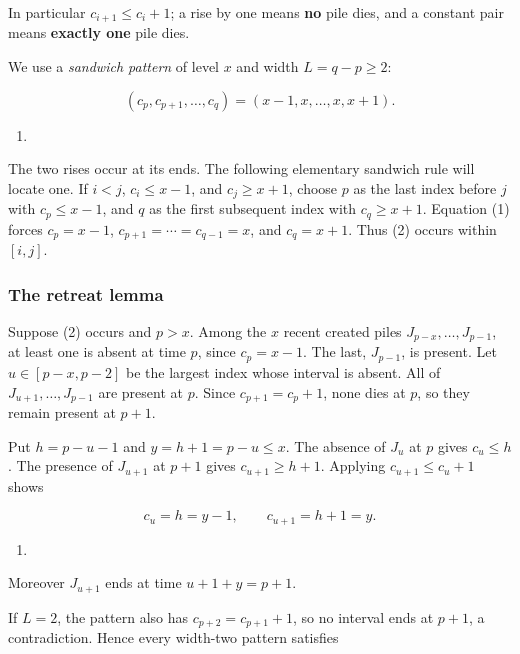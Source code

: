 \documentclass[11pt,a4paper]{article}
\providecommand{\tightlist}{\setlength{\itemsep}{0pt}\setlength{\parskip}{0pt}}
\begin{document}
In particular \(c_{i+1}\le c_i+1\); a rise by one means \textbf{no} pile dies, and a constant pair means \textbf{exactly one} pile dies.

We use a \emph{sandwich pattern} of level \(x\) and width \(L=q-p\ge2\):

\[
(c_p,c_{p+1},\ldots,c_q)=(x-1,x,\ldots,x,x+1).
\]

\begin{enumerate}
\def\labelenumi{(\arabic{enumi})}
\setcounter{enumi}{1}
\tightlist
\item
\end{enumerate}

The two rises occur at its ends. The following elementary sandwich rule will locate one. If \(i<j\), \(c_i\le x-1\), and \(c_j\ge x+1\), choose \(p\) as the last index before \(j\) with \(c_p\le x-1\), and \(q\) as the first subsequent index with \(c_q\ge x+1\). Equation (1) forces \(c_p=x-1\), \(c_{p+1}=\cdots=c_{q-1}=x\), and \(c_q=x+1\). Thus (2) occurs within \([i,j]\).

\subsubsection{The retreat lemma}\label{the-retreat-lemma}

Suppose (2) occurs and \(p>x\). Among the \(x\) recent created piles \(J_{p-x},\ldots,J_{p-1}\), at least one is absent at time \(p\), since \(c_p=x-1\). The last, \(J_{p-1}\), is present. Let \(u\in[p-x,p-2]\) be the largest index whose interval is absent. All of \(J_{u+1},\ldots,J_{p-1}\) are present at \(p\). Since \(c_{p+1}=c_p+1\), none dies at \(p\), so they remain present at \(p+1\).

Put \(h=p-u-1\) and \(y=h+1=p-u\le x\). The absence of \(J_u\) at \(p\) gives \(c_u\le h\). The presence of \(J_{u+1}\) at \(p+1\) gives \(c_{u+1}\ge h+1\). Applying \(c_{u+1}\le c_u+1\) shows

\[
c_u=h=y-1,\qquad c_{u+1}=h+1=y.
\]

\begin{enumerate}
\def\labelenumi{(\arabic{enumi})}
\setcounter{enumi}{2}
\tightlist
\item
\end{enumerate}

Moreover \(J_{u+1}\) ends at time \(u+1+y=p+1\).

If \(L=2\), the pattern also has \(c_{p+2}=c_{p+1}+1\), so no interval ends at \(p+1\), a contradiction. Hence every width-two pattern satisfies
\end{document}
